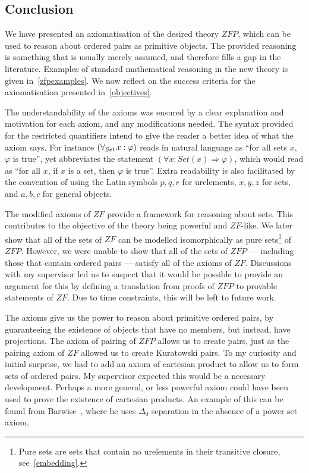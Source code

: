 \documentclass[11pt]{report}
\newcommand{\all}[1]{\forall_{\mathit{#1}}\hspace{0.5mm}}
\theoremstyle{definition}
\theoremstyle{theorem}
\theoremstyle{lemma}
\begin{document}
\subsection{Conclusion}
We have presented an axiomatisation of the desired theory $\mathit{ZFP}$, which can be used to reason about ordered pairs as primitive objects.
The provided reasoning is something that is usually merely assumed, and therefore fills a gap in the literature.
Examples of standard mathematical reasoning in the new theory is given in~\ref{zfpexamples}. 
We now reflect on the success criteria for the axiomatisation presented in~\ref{objectives}.

The understandability of the axioms was ensured by a clear explanation and motivation for each axiom, and any modifications needed. 
The syntax provided for the restricted quantifiers intend to give the reader a better idea of what the axiom says.
For instance $(\all{Set} x: \varphi)$ reads in natural language as ``for all sets $x$, $\varphi$ is true'', yet abbreviates the statement $(\forall x: \mathit{Set}(x) \Rightarrow \varphi)$, which would read as ``for all $x$, if $x$ is a set, then $\varphi$ is true''.
Extra readability is also facilitated by the convention of using the Latin symbols $p,q,r$ for urelements, $x,y,z$ for sets, and $a,b,c$ for general objects.  

The modified axioms of $\mathit{ZF}$ provide a framework for reasoning about sets. 
This contributes to the objective of the theory being powerful and $\mathit{ZF}$-like.
We later show that all of the sets of $\mathit{ZF}$ can be modelled isomorphically as pure sets\footnote{Pure sets are sets that contain no urelements in their transitive closure, see~\ref{embedding}.} of $\mathit{ZFP}$.
However, we were unable to show that all of the sets of $\mathit{ZFP}$ --- including those that contain ordered pairs --- satisfy all of the axioms of $\mathit{ZF}$.
Discussions with my supervisor led us to suspect that it would be possible to provide an argument for this by defining a translation from proofs of $\mathit{ZFP}$ to provable statements of $\mathit{ZF}$.   
Due to time constraints, this will be left to future work. 

The axioms give us the power to reason about primitive ordered pairs, by guaranteeing the existence of objects that have no members, but instead, have projections.
The axiom of pairing of $\mathit{ZFP}$ allows us to create pairs, just as the pairing axiom of $\mathit{ZF}$ allowed us to create Kuratowski pairs. 
To my curiosity and initial surprise, we had to add an axiom of cartesian product to allow us to form sets of ordered pairs.
My supervisor expected this would be a necessary development.
Perhaps a more general, or less powerful axiom could have been used to prove the existence of cartesian products. 
An example of this can be found from Barwise~\cite{barwise}, where he uses $\Delta_0$ separation in the absence of a power set axiom.  
\end{document}
